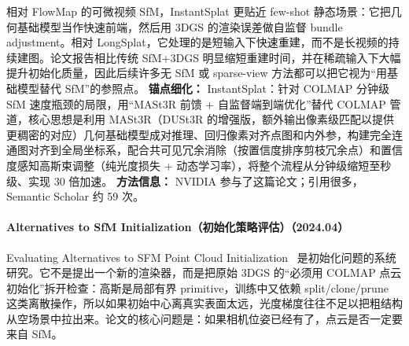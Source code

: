 相对 FlowMap 的可微视频 SfM，InstantSplat 更贴近 few-shot 静态场景：它把几何基础模型当作快速前端，然后用 3DGS 的渲染误差做自监督 bundle adjustment。相对 LongSplat，它处理的是短输入下快速重建，而不是长视频的持续建图。论文报告相比传统 SfM+3DGS 明显缩短重建时间，并在稀疏输入下大幅提升初始化质量，因此后续许多无 SfM 或 sparse-view 方法都可以把它视为“用基础模型替代 SfM”的参照点。
\textbf{锚点细化：} InstantSplat：针对 COLMAP 分钟级 SfM 速度瓶颈的局限，用``MASt3R 前馈 + 自监督端到端优化''替代 COLMAP 管道，核心思想是利用 MASt3R（DUSt3R 的增强版，额外输出像素级匹配以提供更稠密的对应）几何基础模型成对推理、回归像素对齐点图和内外参，构建完全连通图对齐到全局坐标系，配合共可见冗余消除（按置信度排序剪枝冗余点）和置信度感知高斯束调整（纯光度损失 + 动态学习率），将整个流程从分钟级缩短至秒级、实现 30 倍加速。
\textbf{方法信息：} NVIDIA 参与了这篇论文；引用很多，Semantic Scholar 约 59 次。



\paragraph{Alternatives to SfM Initialization（初始化策略评估）（2024.04）}
Evaluating Alternatives to SFM Point Cloud Initialization~\cite{2404_12547} 是初始化问题的系统研究。它不是提出一个新的渲染器，而是把原始 3DGS 的“必须用 COLMAP 点云初始化”拆开检查：高斯是局部有界 primitive，训练中又依赖 split/clone/prune 这类离散操作，所以如果初始中心离真实表面太远，光度梯度往往不足以把粗结构从空场景中拉出来。论文的核心问题是：如果相机位姿已经有了，点云是否一定要来自 SfM。


